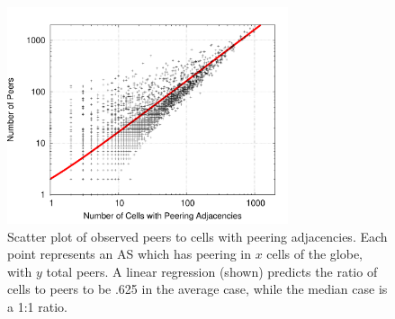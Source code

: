 
    \begin{figure}[tb]
\centering
\includegraphics[width=3.25in]{scatter}
\caption[]{\label{fig:scatter} Scatter plot of observed peers to cells with peering adjacencies. Each point represents an AS which has peering in $x$ cells of the globe, with $y$ total peers. A linear regression (shown) predicts the ratio of cells to peers to be .625 in the average case, while the median case is a 1:1 ratio.} 
\end{figure}

